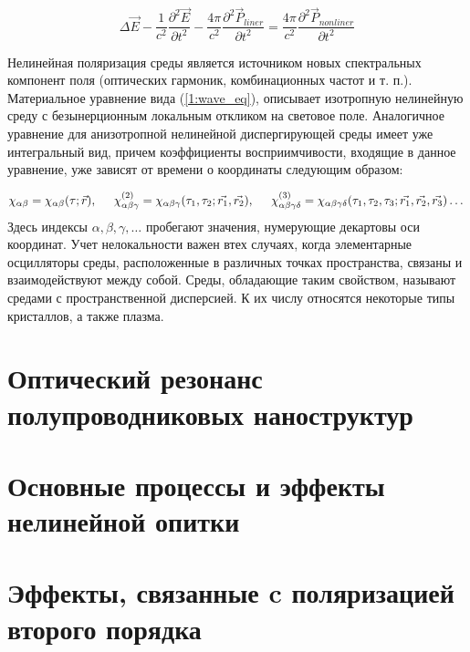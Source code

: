 \begin{equation}\label{1:wave_eq2}
\Delta\vec{E} - \frac{ 1 }{ c^2 }\frac{\partial^2 \vec{E} }{\partial t^2} - \frac{ 4\pi }{ c^2 }\frac{\partial^2 \vec{P}_{liner}}{\partial t^2} =  \frac{ 4\pi }{ c^2 }\frac{\partial^2 \vec{P} _{nonliner}}{\partial t^2}
\end{equation}

 Нелинейная поляризация среды является источником новых спектральных компонент поля
(оптических гармоник, комбинационных частот и т. п.). Материальное уравнение вида  (\ref{1:wave_eq}), описывает изотропную нелинейную среду с безынерционным локальным откликом на световое поле. Аналогичное
уравнение для анизотропной нелинейной диспергирующей среды имеет уже интегральный вид, причем коэффициенты восприимчивости, входящие в данное уравнение, уже зависят от времени о координаты следующим образом:

 \begin{equation}\label{1:chi}
\chi_{\alpha \beta} =  \chi_{\alpha \beta}(\tau ; \vec{r}),
\hspace{5mm}
\chi_{\alpha\beta\gamma}^{(2)}= \chi_{\alpha\beta\gamma}(\tau_{1},\tau_{2};\vec{r_{1}}, \vec{r_{2} }),
\hspace{5mm}
\chi_{\alpha\beta\gamma\delta}^{(3)} = \chi_{\alpha\beta\gamma\delta}(\tau_{1},\tau_{2},\tau_{3};\vec{r_{1}}, \vec{r_{2}}, \vec{r_{3} })
\dots
\end{equation}
Здесь индексы $\alpha, \beta, \gamma, \dots$ пробегают значения, нумерующие декартовы оси координат. Учет нелокальности важен втех случаях, когда элементарные осцилляторы среды, расположенные в различных точках пространства, связаны и взаимодействуют между собой. Среды, обладающие таким свойством, называют средами с пространственной дисперсией. К их числу относятся некоторые типы кристаллов, а также плазма.
\section{Оптический резонанс полупроводниковых наноструктур}


\section{Основные процессы и эффекты нелинейной опитки}


\section{Эффекты, связанные c поляризацией второго порядка}

